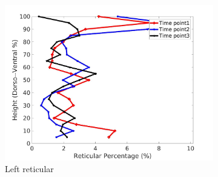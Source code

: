 \begin{figure}[H]
\begin{subfigure}{.42\linewidth}
  \includegraphics[width=\linewidth,trim={{.0\wd0} {.0\wd0} {.0\wd0} {.0\wd0}},clip]{QuantitativeAnalysis/Image/IPF21LeftLungReticularDiseaseDorsoToVentral.jpg} %
  \caption{Left reticular}
  \label{fig:IPF21DiseaseDorsoToVentralMain-c} 
\end{subfigure} 
\begin{subfigure}{.42\linewidth}%

\end{subfigure}
\end{figure}
